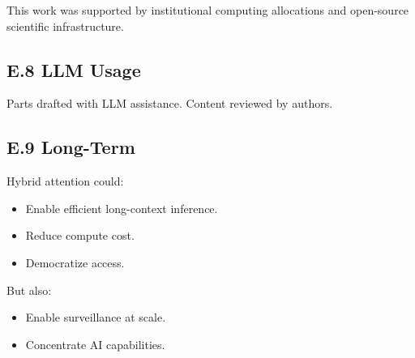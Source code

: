 This work was supported by institutional computing allocations and open-source scientific infrastructure.

\subsection{E.8 LLM Usage}

Parts drafted with LLM assistance. Content reviewed by authors.

\subsection{E.9 Long-Term}

Hybrid attention could:
\begin{itemize}
\item Enable efficient long-context inference.
\item Reduce compute cost.
\item Democratize access.

\end{itemize}
But also:
\begin{itemize}
\item Enable surveillance at scale.
\item Concentrate AI capabilities.

\end{itemize}
